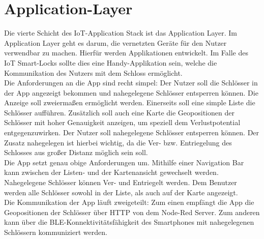 
\section{Application-Layer}
Die vierte Schicht des IoT-Application Stack ist das Application Layer. Im Application Layer geht es darum, die vernetzten Geräte für den Nutzer verwendbar zu machen. Hierfür werden Applikationen entwickelt. Im Falle des IoT Smart-Locks sollte dies eine Handy-Applikation sein, welche die Kommunikation des Nutzers mit dem Schloss ermöglicht.
\\ 
Die Anforderungen an die App sind recht simpel: Der Nutzer soll die Schlösser in der App angezeigt bekommen und nahegelegene Schlösser entsperren können. Die Anzeige soll zweiermaßen ermöglicht werden. Einerseits soll eine simple Liste die Schlösser aufführen. Zusätzlich soll auch eine Karte die Geopositionen der Schlösser mit hoher Genauigkeit anzeigen, um speziell dem Verlustpotential entgegenzuwirken. Der Nutzer soll nahegelegene Schlösser entsperren können. Der Zusatz nahegelegen ist hierbei wichtig, da die Ver- bzw. Entriegelung des Schlosses aus großer Distanz möglich sein soll.
\\ 
Die App setzt genau obige Anforderungen um. Mithilfe einer Navigation Bar kann zwischen der Listen- und der Kartenansicht gewechselt werden. Nahegelegene Schlösser können Ver- und Entriegelt werden. Dem Benutzer werden alle Schlösser sowohl in der Liste, als auch auf der Karte angezeigt.
\\ 
Die Kommunikation der App läuft zweigeteilt: Zum einen empfängt die App die Geopositionen der Schlösser über \ac{HTTP} von dem Node-Red Server. Zum anderen kann über die \ac{BLE}-Konnektivitätsfähigkeit des Smartphones mit nahegelegenen Schlössern kommuniziert werden. 